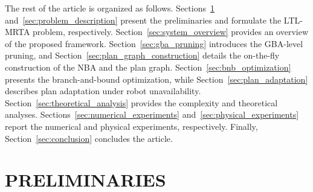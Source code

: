 \documentclass[lettersize,journal]{IEEEtran}
\theoremstyle{italiclemma}
\theoremstyle{italiclemma}
\theoremstyle{definition}
\begin{document}
The rest of the article is organized as follows.
Sections~\ref{sec:preliminaries} and~\ref{sec:problem_description} present the preliminaries and formulate the LTL-MRTA problem, respectively.
Section~\ref{sec:system_overview} provides an overview of the proposed framework. Section~\ref{sec:gba_pruning} introduces the GBA-level pruning, and Section~\ref{sec:plan_graph_construction} details the on-the-fly construction of the NBA and the plan graph. Section~\ref{sec:bnb_optimization} presents the branch-and-bound optimization, while Section~\ref{sec:plan_adaptation} describes plan adaptation under robot unavailability. Section~\ref{sec:theoretical_analysis} provides the complexity and theoretical analyses. Sections~\ref{sec:numerical_experiments} and~\ref{sec:physical_experiments} report the numerical and physical experiments, respectively. Finally, Section~\ref{sec:conclusion} concludes the article.



\section{PRELIMINARIES}
\label{sec:preliminaries}
\end{document}
